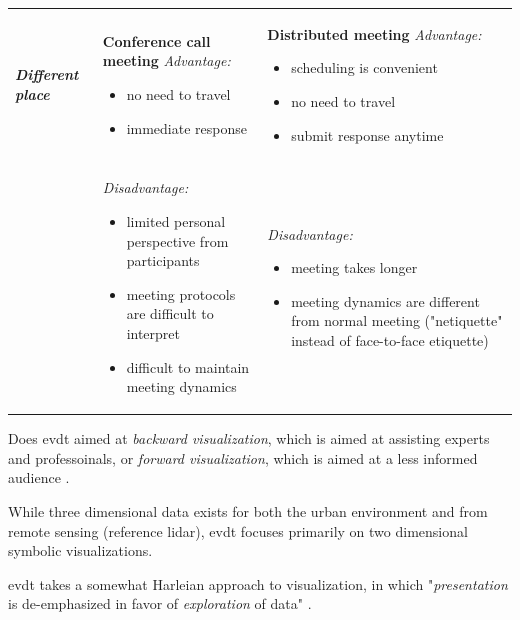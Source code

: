 \begin{table}[h]
\begin{center}
\begin{tabular}{ L{3cm} L{5.5cm}  L{5.5cm}}
\textbf{\textit{Different place}} & \textbf{Conference call meeting} \qquad \textit{Advantage:} 
\vspace{-5mm}
\begin{itemize}
    \setlength{\itemsep}{0pt}%
    \setlength{\parskip}{0pt}%
	\item{no need to travel}
	\item{immediate response}
\end{itemize} &
\textbf{Distributed meeting} \qquad \textit{Advantage:} 
\vspace{-5mm}
\begin{itemize}
    \setlength{\itemsep}{0pt}%
    \setlength{\parskip}{0pt}%
	\item{scheduling is convenient}
	\item{no need to travel}
	\item{submit response anytime}
\end{itemize} 
\\
& \textit{Disadvantage:} 
\vspace{-5mm}
\begin{itemize}
    \setlength{\itemsep}{0pt}%
    \setlength{\parskip}{0pt}%
	\item{limited personal perspective from participants}
	\item{meeting protocols are difficult to interpret}
	\item{difficult to maintain meeting dynamics}
\end{itemize} &
\textit{Disadvantage:} 
\vspace{-5mm}
\begin{itemize}
    \setlength{\itemsep}{0pt}%
    \setlength{\parskip}{0pt}%
	\item{meeting takes longer}
	\item{meeting dynamics are different from normal meeting ("netiquette" instead of face-to-face etiquette)}
\end{itemize} 
\\ \hline
\end{tabular}
\end{center}
\end{table}

Does \ac{evdt} aimed at \textit{backward visualization}, which is aimed at assisting experts and professoinals, or \textit{forward visualization}, which is aimed at a less informed audience \cite{battyVisualizingCityCommunication2000}.

While three dimensional data exists for both the urban environment \cite{battyVisualizingCityCommunication2000} and from remote sensing (reference lidar), \ac{evdt} focuses primarily on two dimensional symbolic visualizations.

\ac{evdt} takes a somewhat Harleian approach to visualization, in which "\textit{presentation} is de-emphasized in favor of \textit{exploration} of data" \cite{cramptonMapsSocialConstructions2001}.